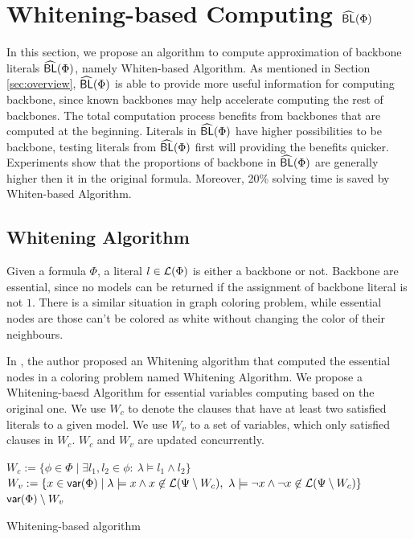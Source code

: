 \section{Whitening-based Computing ${\sf \widehat{BL}}(\Phi)$}

In this section, we propose an algorithm to compute approximation of backbone literals ${\sf \widehat{BL}}(\Phi)$, namely Whiten-based Algorithm. As mentioned in Section \ref{sec:overview}, ${\sf \widehat{BL}}(\Phi)$ is able to provide more useful information for computing backbone, since known backbones may help accelerate computing the rest of backbones. The total computation process benefits from backbones that are computed at the beginning. Literals in ${\sf \widehat{BL}}(\Phi)$ have higher possibilities to be backbone, testing literals from ${\sf \widehat{BL}}(\Phi)$ first will providing the benefits quicker. Experiments show that the proportions of backbone in ${\sf \widehat{BL}}(\Phi)$ are generally higher then it in the original formula. Moreover, 20\% solving time is saved by Whiten-based Algorithm.

\subsection{Whitening Algorithm}

Given a formula $\Phi$, a literal $l\in\Lit(\Phi)$ is either a backbone or not. Backbone are essential, since no models can be returned if the assignment of backbone literal is not $1$. There is a similar situation in graph coloring problem, while essential nodes are those can't be colored as white without changing the color of their neighbours.

In \cite{Par03}, the author proposed an Whitening algorithm that computed the essential nodes in a coloring problem named Whitening Algorithm. We propose a Whitening-baesd Algorithm for essential variables computing based on the original one. We use $W_c$ to denote the clauses that have at least two satisfied literals to a given model. We use $W_v$ to a set of variables, which only satisfied clauses in $W_c$. $W_c$ and $W_v$ are updated concurrently.
\newpage
\begin{algorithm2e}
\SetAlgoShortEnd
\SetFillComment
{}
$W_c:= \{\phi\in\Phi \mid \exists l_1,l_2\in\phi: \  \lambda\models l_1\wedge l_2\}$\; \label{alg2:c}
$W_v:=\{x\in \var(\Phi)\mid \lambda\models x\wedge x\not\in \Lit(\Psi\setminus W_c),
        \ \lambda\models \neg x\wedge \neg x\not\in \Lit(\Psi\setminus W_c)\}$\; \label{alg2:v}
\Return $\textsf{var}(\Phi)\setminus W_v$\;
\caption{Whitening-based algorithm}
\label{alg:whitening}
\end{algorithm2e}

